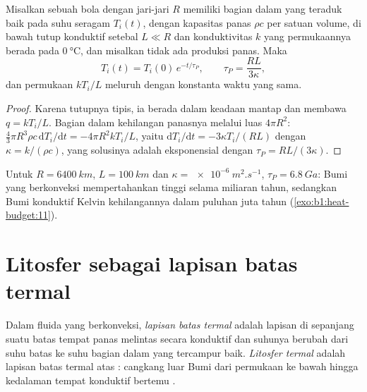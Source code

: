 \begin{proposition}\label{prop:b1:heat-budget:perry}
Misalkan sebuah bola dengan jari-jari $R$ memiliki bagian dalam yang teraduk baik pada suhu seragam $T_i(t)$, dengan kapasitas panas $\rho c$ per satuan volume, di bawah tutup konduktif setebal $L \ll R$ dan konduktivitas $k$ yang permukaannya berada pada $\qty{0}{\degreeCelsius}$, dan misalkan tidak ada produksi panas. Maka
\[
  T_i(t) = T_i(0)\,e^{-t/\tau_P}, \qquad \tau_P = \frac{RL}{3\kappa},
\]
dan  permukaan $kT_i/L$ meluruh dengan konstanta waktu yang sama.
\end{proposition}

\begin{proof}
Karena tutupnya tipis, ia berada dalam keadaan mantap dan membawa 
$q = kT_i/L$. Bagian dalam kehilangan panasnya melalui luas $4\pi R^2$:
$\tfrac43\pi R^3\rho c\,\mathrm dT_i/\mathrm dt = -4\pi R^2 kT_i/L$, yaitu
$\mathrm dT_i/\mathrm dt = -3\kappa T_i/(RL)$ dengan $\kappa = k/(\rho c)$, yang solusinya adalah eksponensial dengan $\tau_P = RL/(3\kappa)$.
\end{proof}

Untuk $R = \qty{6400}{km}$, $L = \qty{100}{km}$ dan $\kappa =
\qty{e-6}{m^2.s^{-1}}$, $\tau_P = \qty{6.8}{Ga}$: Bumi yang berkonveksi mempertahankan  tinggi selama miliaran tahun, sedangkan Bumi konduktif Kelvin kehilangannya dalam puluhan juta tahun (\cref{exo:b1:heat-budget:11}).

\section{Litosfer sebagai lapisan batas termal}\label{sec:b1:heat-budget:boundary-layer}

\begin{definition}\label{def:b1:heat-budget:boundary-layer}
Dalam fluida yang berkonveksi, \emph{lapisan batas termal} adalah lapisan di sepanjang suatu batas tempat panas melintas secara konduktif dan suhunya berubah dari suhu batas ke suhu bagian dalam yang tercampur baik. \emph{Litosfer termal} adalah lapisan batas termal atas : cangkang luar Bumi dari permukaan ke bawah hingga kedalaman tempat  konduktif bertemu .
\end{definition}

